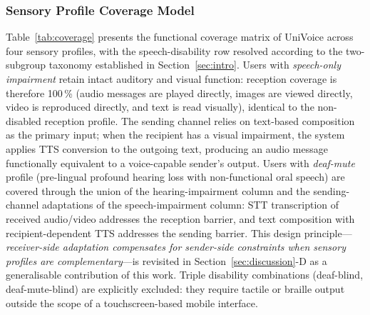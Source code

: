 \documentclass[journal]{IEEEtran}
\begin{document}
	\subsubsection{Sensory Profile Coverage Model}
	\label{sec:coverage}
	Table~\ref{tab:coverage} presents the functional coverage matrix of \textsf{UniVoice} across four sensory profiles, with the speech-disability row resolved according to the two-subgroup taxonomy established in Section~\ref{sec:intro}. Users with \emph{speech-only impairment} retain intact auditory and visual function: reception coverage is therefore 100\,\% (audio messages are played directly, images are viewed directly, video is reproduced directly, and text is read visually), identical to the non-disabled reception profile. The sending channel relies on text-based composition as the primary input; when the recipient has a visual impairment, the system applies TTS conversion to the outgoing text, producing an audio message functionally equivalent to a voice-capable sender's output. Users with \emph{deaf-mute} profile (pre-lingual profound hearing loss with non-functional oral speech) are covered through the union of the hearing-impairment column and the sending-channel adaptations of the speech-impairment column: STT transcription of received audio/video addresses the reception barrier, and text composition with recipient-dependent TTS addresses the sending barrier. This design principle---\emph{receiver-side adaptation compensates for sender-side constraints when sensory profiles are complementary}---is revisited in Section~\ref{sec:discussion}-D as a generalisable contribution of this work. Triple disability combinations (deaf-blind, deaf-mute-blind) are explicitly excluded: they require tactile or braille output outside the scope of a touchscreen-based mobile interface.
	
\end{document}
